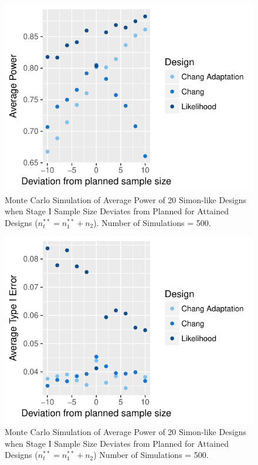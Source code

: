 \documentclass[12pt]{report}\usepackage[]{graphicx}\usepackage[]{color}
\newlength{\li}\setlength{\li}{14.48pt}
\begin{document}
\begin{figure}[]
\caption{Monte Carlo Simulation of Average Power of 20 Simon-like Designs when Stage I Sample Size Deviates from Planned for Attained Designs ($n_t^{\ast\ast} = n_1^{\ast\ast} + n_2$). Number of Simulations = 500.}
\centering
\begin{Schunk}


\centerline{\includegraphics{unnamed-chunk-5-1} }

\end{Schunk}
\end{figure}
\begin{figure}[]
\caption{Monte Carlo Simulation of Average Power of 20 Simon-like Designs when Stage I Sample Size Deviates from Planned for Attained Designs ($n_t^{\ast\ast} = n_1^{\ast\ast} + n_2$) Number of Simulations = 500.}
\centering
\begin{Schunk}


\centerline{\includegraphics{unnamed-chunk-6-1} }

\end{Schunk}
\end{figure}
\end{document}
